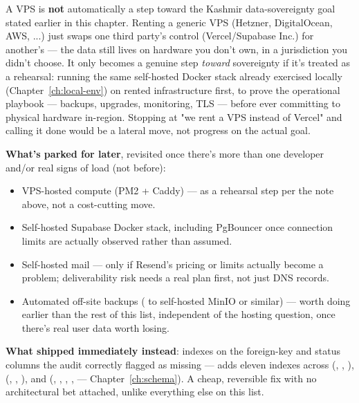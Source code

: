 \begin{olkwarn}
A VPS is \textbf{not} automatically a step toward the Kashmir data-sovereignty goal stated earlier in this chapter. Renting a generic VPS (Hetzner, DigitalOcean, AWS, ...) just swaps one third party's control (Vercel/Supabase Inc.) for another's — the data still lives on hardware you don't own, in a jurisdiction you didn't choose. It only becomes a genuine step \emph{toward} sovereignty if it's treated as a rehearsal: running the same self-hosted Docker stack already exercised locally (Chapter~\ref{ch:local-env}) on rented infrastructure first, to prove the operational playbook — backups, upgrades, monitoring, TLS — before ever committing to physical hardware in-region. Stopping at "we rent a VPS instead of Vercel" and calling it done would be a lateral move, not progress on the actual goal.
\end{olkwarn}

\textbf{What's parked for later}, revisited once there's more than one developer and/or real signs of load (not before):
\begin{itemize}
  \item VPS-hosted compute (PM2 + Caddy) — as a rehearsal step per the note above, not a cost-cutting move.
  \item Self-hosted Supabase Docker stack, including PgBouncer once connection limits are actually observed rather than assumed.
  \item Self-hosted mail — only if Resend's pricing or limits actually become a problem; deliverability risk needs a real plan first, not just DNS records.
  \item Automated off-site backups ( to self-hosted MinIO or similar) — worth doing earlier than the rest of this list, independent of the hosting question, once there's real user data worth losing.
\end{itemize}

\textbf{What shipped immediately instead}: indexes on the foreign-key and status columns the audit correctly flagged as missing —  adds eleven  indexes across  (, , ),  (, , ), and  (, , , ,  — Chapter~\ref{ch:schema}). A cheap, reversible fix with no architectural bet attached, unlike everything else on this list.

